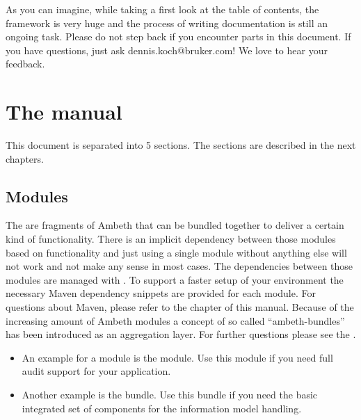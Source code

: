 As you can imagine, while taking a first look at the table of contents, the framework is very huge and the process of writing documentation is still an ongoing task. Please do not step back if you encounter \TODO parts in this document. If you have questions, just ask dennis.koch@bruker.com! We love to hear your feedback.

\section{The manual}
This document is separated into 5 sections. The sections are described in the next chapters.
\subsection{Modules}

The  are fragments of Ambeth that can be bundled together to deliver a certain kind of functionality. There is an implicit dependency between those modules based on functionality and just using a single module without anything else will not work and not make any sense in most cases. The dependencies between those modules are managed with . To support a faster setup of your environment the
necessary Maven dependency snippets are provided for each module. For questions about Maven, please refer to the  chapter of this manual. Because of the increasing amount of Ambeth modules a concept of so called ``ambeth-bundles'' has been introduced as an aggregation layer. For further questions please see the .

\begin{itemize}
  \item An example for a module is the  module. Use this module if you need full  audit support for your application.
  \item Another example is the  bundle. Use this bundle if you need the basic integrated set of components for the information model handling.
\end{itemize}

\def\showimgref{img/platform-overview.png}

